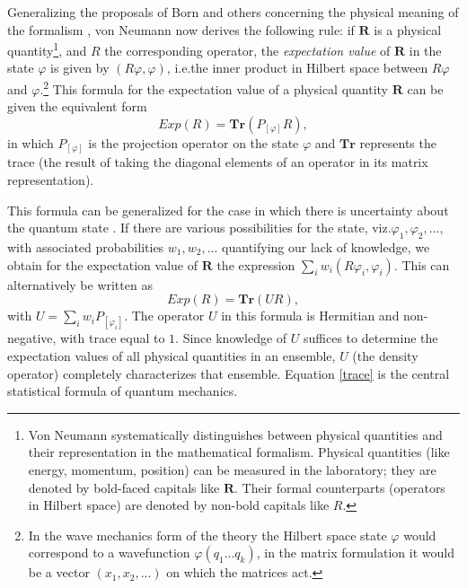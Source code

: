\documentclass[11pt]{article}
\begin{document}
Generalizing the proposals of Born and others concerning the physical meaning of the formalism \cite[III.1]{VN1}, von Neumann now derives the following rule: if $\textbf{R}$ is a physical quantity\footnote{Von Neumann systematically distinguishes between physical quantities and their representation in the mathematical formalism. Physical quantities (like energy, momentum, position) can be measured in the laboratory; they are denoted by bold-faced capitals like $\textbf{R}$. Their formal counterparts (operators in Hilbert space) are denoted by non-bold capitals like $R$.}, and $R$ the corresponding operator, the \emph{expectation value} of $\textbf{R}$ in the state $\varphi$ is given by $(R\varphi, \varphi)$, i.e.\@ the inner product in Hilbert space between $R\varphi$ and $\varphi$.\footnote{In the wave mechanics form of the theory the Hilbert space state $\varphi$ would correspond to a wavefunction $\varphi(q_1...q_k)$, in the matrix formulation it would be a vector $(x_1, x_2,...)$ on which the matrices act.} This formula for the expectation value of a physical quantity $\textbf{R}$ can be given the equivalent form
\begin{equation*}
  Exp(R) = \textbf{Tr}(P_{[\varphi]}R),
\end{equation*}
in which $P_{[\varphi]}$ is the projection operator on the state $\varphi$ and $\textbf{Tr}$ represents the trace (the result of taking the diagonal elements of an operator in its matrix representation).

This formula can be generalized for the case in which there is uncertainty about the quantum state \cite[pp.\@ 157--158]{VN1}. If there are various possibilities for the state, viz.\@ $\varphi_1, \varphi_2, ...$, with associated probabilities $w_1, w_2, ...$ quantifying our lack of knowledge, we obtain for the expectation value of $\textbf{R}$ the expression $\sum_i w_i (R\varphi_i, \varphi_i)$. This can alternatively be written as
\begin{equation}\label{trace}
 Exp(R) = \textbf{Tr} (U R),
\end{equation}
with $ U = \sum_i w_i P_{[\varphi_i]}$. The operator $U$ in this formula is Hermitian and non-negative, with trace equal to $1$. Since knowledge of $U$ suffices to determine the expectation values of all physical quantities in an ensemble, $U$ (the density operator) completely characterizes that ensemble. Equation \ref{trace} is the central statistical formula of quantum mechanics.
\end{document}
